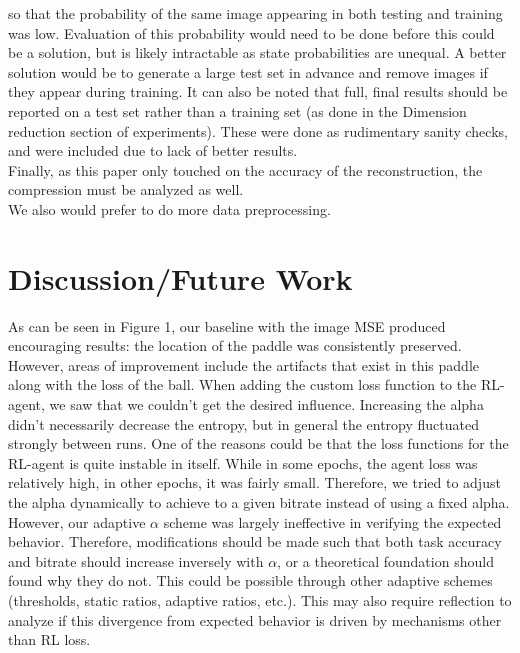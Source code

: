 so that the probability of the same image appearing in both testing and training
was low. Evaluation of this probability would need to be done before this could
be a solution, but is likely intractable as state probabilities are unequal. A
better solution would be to generate a large test set in advance and remove
images if they appear during training. It can also be noted that full, final
results should be reported on a test set rather than a training set (as done in
the Dimension reduction section of experiments). These were done as rudimentary
sanity checks, and were included due to lack of better results.\\
Finally, as this paper only touched on the accuracy of the reconstruction, the
compression must be analyzed as well. \\
We also would prefer to do more data preprocessing.


\section{Discussion/Future Work}
As can be seen in Figure 1, our baseline with the image MSE produced encouraging
results: the location of the paddle was consistently preserved. However, areas
of improvement include the artifacts that exist in this paddle along with the
loss of the ball.
When adding the custom loss function to the RL-agent, we saw that we couldn't
get the desired influence. Increasing the alpha didn't necessarily decrease the
entropy, but in general the entropy fluctuated strongly between runs. One
of the reasons could be that the loss functions for the RL-agent is quite
instable in itself. While in some epochs, the agent loss was relatively high, in
other epochs, it was fairly small. Therefore, we tried to adjust the alpha
dynamically to achieve to a given bitrate instead of using a fixed alpha.
However, our adaptive $\alpha$ scheme was largely ineffective in verifying the
expected behavior. Therefore, modifications should be made such that both task
accuracy and bitrate should increase inversely with $\alpha$, or a theoretical
foundation should found why they do not. This could be possible through other
adaptive schemes (thresholds, static ratios, adaptive ratios, etc.). This may
also require reflection to analyze if this divergence from expected behavior is
driven by mechanisms other than RL loss. \\

